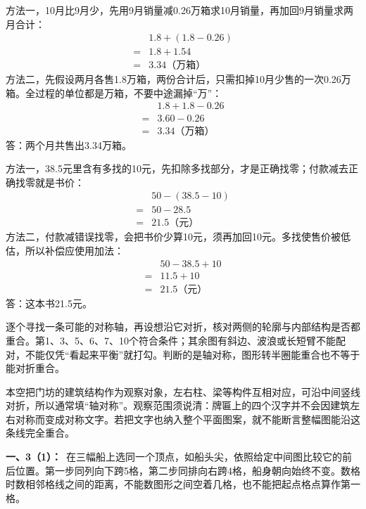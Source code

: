 \documentclass[multi=snippet,border=0pt]{standalone}
\newenvironment{snippet}[3]{\begin{minipage}{#1bp}\color{answerred}\fontsize{#2}{#3}\selectfont\raggedright}{\end{minipage}}
\begin{document}
\begin{snippet}{505}{11.5}{14}方法一，10月比9月少，先用9月销量减0.26万箱求10月销量，再加回9月销量求两月合计：\[\begin{aligned}&1.8+(1.8-0.26)\\={}&1.8+1.54\\={}&3.34\text{（万箱）}\end{aligned}\]方法二，先假设两月各售1.8万箱，两份合计后，只需扣掉10月少售的一次0.26万箱。全过程的单位都是万箱，不要中途漏掉“万”：\[\begin{aligned}&1.8+1.8-0.26\\={}&3.60-0.26\\={}&3.34\text{（万箱）}\end{aligned}\]答：两个月共售出3.34万箱。\end{snippet}
\begin{snippet}{505}{11.5}{14}方法一，38.5元里含有多找的10元，先扣除多找部分，才是正确找零；付款减去正确找零就是书价：\[\begin{aligned}&50-(38.5-10)\\={}&50-28.5\\={}&21.5\text{（元）}\end{aligned}\]方法二，付款减错误找零，会把书价少算10元，须再加回10元。多找使售价被低估，所以补偿应使用加法：\[\begin{aligned}&50-38.5+10\\={}&11.5+10\\={}&21.5\text{（元）}\end{aligned}\]答：这本书21.5元。\end{snippet}
\begin{snippet}{505}{11.5}{14}逐个寻找一条可能的对称轴，再设想沿它对折，核对两侧的轮廓与内部结构是否都重合。第1、3、5、6、7、10个符合条件；其余图有斜边、波浪或长短臂不能配对，不能仅凭“看起来平衡”就打勾。判断的是轴对称，图形转半圈能重合也不等于能对折重合。\end{snippet}
\begin{snippet}{505}{11.5}{14}本空把门坊的建筑结构作为观察对象，左右柱、梁等构件互相对应，可沿中间竖线对折，所以通常填“轴对称”。观察范围须说清：牌匾上的四个汉字并不会因建筑左右对称而变成对称文字。若把文字也纳入整个平面图案，就不能断言整幅图能沿这条线完全重合。\end{snippet}
\begin{snippet}{505}{11.5}{14}\textbf{一、3（1）：}\ 在三幅船上选同一个顶点，如船头尖，依照给定中间图比较它的前后位置。第一步同列向下跨5格，第二步同排向右跨4格，船身朝向始终不变。数格时数相邻格线之间的距离，不能数图形之间空着几格，也不能把起点格点算作第一格。\end{snippet}
\end{document}

